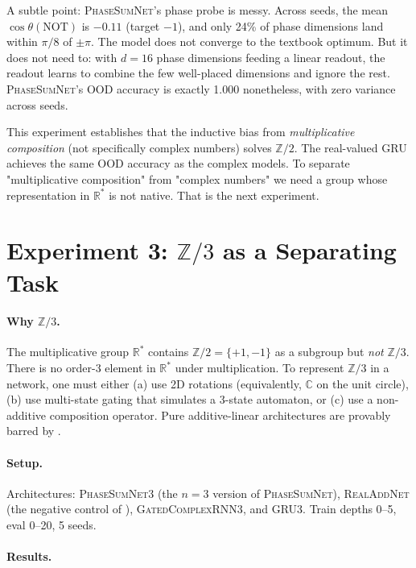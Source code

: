 \documentclass[11pt]{article}
\theoremstyle{definition}
\newcommand{\R}{\mathbb{R}}
\newcommand{\C}{\mathbb{C}}
\newcommand{\Z}{\mathbb{Z}}
\begin{document}
A subtle point: \textsc{PhaseSumNet}'s phase probe is messy. Across
seeds, the mean $\cos\theta(\mathrm{NOT})$ is $-0.11$ (target $-1$),
and only 24\% of phase dimensions land within $\pi/8$ of $\pm\pi$.
The model does not converge to the textbook optimum. But it does not
need to: with $d=16$ phase dimensions feeding a linear readout, the
readout learns to combine the few well-placed dimensions and ignore
the rest. \textsc{PhaseSumNet}'s OOD accuracy is exactly 1.000
nonetheless, with zero variance across seeds.

This experiment establishes that the inductive bias from
\emph{multiplicative composition} (not specifically complex numbers)
solves $\Z/2$. The real-valued GRU achieves the same OOD accuracy as
the complex models. To separate "multiplicative composition" from
"complex numbers" we need a group whose representation in $\R^*$
is not native. That is the next experiment.


\section{Experiment 3: $\Z/3$ as a Separating Task}
\label{sec:exp3}

\paragraph{Why $\Z/3$.} The multiplicative group $\R^*$ contains
$\Z/2 = \{+1, -1\}$ as a subgroup but \emph{not} $\Z/3$. There is
no order-3 element in $\R^*$ under multiplication. To represent
$\Z/3$ in a network, one must either (a) use 2D rotations
(equivalently, $\C$ on the unit circle), (b) use multi-state gating
that simulates a 3-state automaton, or (c) use a non-additive
composition operator. Pure additive-linear architectures are
provably barred by .

\paragraph{Setup.} Architectures: \textsc{PhaseSumNet3} (the $n=3$
version of \textsc{PhaseSumNet}), \textsc{RealAddNet} (the negative
control of ), \textsc{GatedComplexRNN3}, and
\textsc{GRU3}. Train depths 0--5, eval 0--20, 5 seeds.

\paragraph{Results.}
\end{document}
